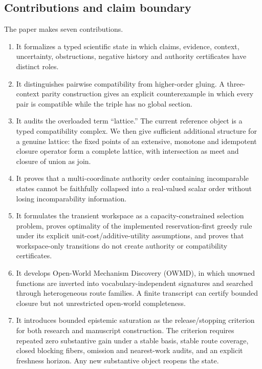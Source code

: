 \subsection{Contributions and claim boundary}

The paper makes seven contributions.

\begin{enumerate}[leftmargin=*]
\item It formalizes a typed scientific state in which claims, evidence, context, uncertainty, obstructions, negative history and authority certificates have distinct roles.
\item It distinguishes pairwise compatibility from higher-order gluing. A three-context parity construction gives an explicit counterexample in which every pair is compatible while the triple has no global section.
\item It audits the overloaded term ``lattice.'' The current reference object is a typed compatibility complex. We then give sufficient additional structure for a genuine lattice: the fixed points of an extensive, monotone and idempotent closure operator form a complete lattice, with intersection as meet and closure of union as join.
\item It proves that a multi-coordinate authority order containing incomparable states cannot be faithfully collapsed into a real-valued scalar order without losing incomparability information.
\item It formulates the transient workspace as a capacity-constrained selection problem, proves optimality of the implemented reservation-first greedy rule under its explicit unit-cost/additive-utility assumptions, and proves that workspace-only transitions do not create authority or compatibility certificates.
\item It develops Open-World Mechanism Discovery (OWMD), in which unowned functions are inverted into vocabulary-independent signatures and searched through heterogeneous route families. A finite transcript can certify bounded closure but not unrestricted open-world completeness.
\item It introduces bounded epistemic saturation as the release/stopping criterion for both research and manuscript construction. The criterion requires repeated zero substantive gain under a stable basis, stable route coverage, closed blocking fibers, omission and nearest-work audits, and an explicit freshness horizon. Any new substantive object reopens the state.
\end{enumerate}

